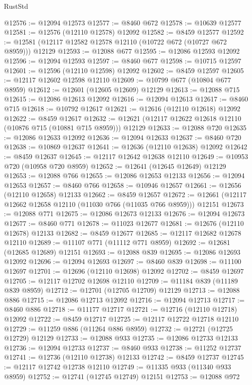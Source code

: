 \begin{lexlean}{RustStd}
\begin{coremodule}
@12576 := @12094 @12573
@12577 := @8460 @672
@12578 := @10639 @12577
@12581 := @12576 (@12110 @12578) @12092
@12582 := @8459 @12577
@12592 := @12581 (@12117 @12582 @12578 @12110 (@10722 @672 (@10727 @672 @8959))) @12129
@12593 := @12088 @677
@12595 := @12086 @12593 @12092
@12596 := @12094 @12593
@12597 := @8460 @677
@12598 := @10715 @12597
@12601 := @12596 (@12110 @12598) @12092
@12602 := @8459 @12597
@12605 := @12117 @12602 @12598 @12110
@12609 := @10799 @677 (@10804 @677 @8959)
@12612 := @12601 (@12605 @12609) @12129
@12613 := @12088 @715
@12615 := @12086 @12613 @12092
@12616 := @12094 @12613
@12617 := @8460 @715
@12618 := @10792 @12617
@12621 := @12616 (@12110 @12618) @12092
@12622 := @8459 @12617
@12632 := @12621 (@12117 @12622 @12618 @12110 (@10876 @715 (@10881 @715 @8959))) @12129
@12633 := @12088 @720
@12635 := @12086 @12633 @12092
@12636 := @12094 @12633
@12637 := @8460 @720
@12638 := @10869 @12637
@12641 := @12636 (@12110 @12638) @12092
@12642 := @8459 @12637
@12645 := @12117 @12642 @12638 @12110
@12649 := @10953 @720 (@10958 @720 @8959)
@12652 := @12641 (@12645 @12649) @12129
@12653 := @12088 @766
@12655 := @12086 @12653 @12133
@12656 := @12094 @12653
@12657 := @8460 @766
@12658 := @10946 @12657
@12661 := @12656 (@12110 @12658) @12133
@12662 := @8459 @12657
@12672 := @12661 (@12117 @12662 @12658 @12110 (@11030 @766 (@11035 @766 @8959))) @12151
@12673 := @12088 @771
@12675 := @12086 @12673 @12133
@12676 := @12094 @12673
@12677 := @8460 @771
@12678 := @11023 @12677
@12681 := @12676 (@12110 @12678) @12133
@12682 := @8459 @12677
@12685 := @12117 @12682 @12678 @12110
@12689 := @11107 @771 (@11112 @771 @8959)
@12692 := @12681 (@12685 @12689) @12151
@12693 := @12088 @839
@12695 := @12086 @12693 @12092
@12696 := @12094 @12693
@12697 := @8460 @839
@12698 := @11100 @12697
@12701 := @12696 (@12110 @12698) @12092
@12702 := @8459 @12697
@12705 := @12117 @12702 @12698 @12110
@12709 := @11184 @839 (@11189 @839 @8959)
@12712 := @12701 (@12705 @12709) @12129
@12713 := @12088 @886
@12715 := @12086 @12713 @12092
@12716 := @12094 @12713
@12717 := @8460 @886
@12718 := @11177 @12717
@12721 := @12716 (@12110 @12718) @12092
@12722 := @8459 @12717
@12725 := @12117 @12722 @12718 @12110
@12729 := @11259 @886 (@11264 @886 @8959)
@12732 := @12721 (@12725 @12729) @12129
@12733 := @12088 @933
@12735 := @12086 @12733 @12133
@12736 := @12094 @12733
@12737 := @8460 @933
@12738 := @11252 @12737
@12741 := @12736 (@12110 @12738) @12133
@12742 := @8459 @12737
@12745 := @12117 @12742 @12738 @12110
@12749 := @11335 @933 (@11340 @933 @8959)
@12752 := @12741 (@12745 @12749) @12151
@12753 := @12088 @972

\end{coremodule}
\end{lexlean}
